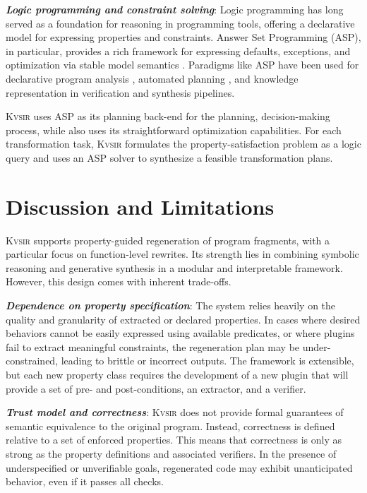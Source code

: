 \documentclass[sigplan,review,anonymous,10pt]{acmart}
\newcommand{\sys}{{\scshape Kv{\textalpha}sir}\xspace}
\newcommand{\heading}[1]{\vspace{2pt}\noindent\textbf{\emph{#1}}:\enspace}
\begin{document}
\heading{Logic programming and constraint solving}
Logic programming has long served as a foundation for reasoning in programming
tools, offering a declarative model for expressing properties and constraints.
Answer Set Programming (ASP), in particular, provides a rich framework for
expressing defaults, exceptions, and optimization via stable model semantics
\cite{Gelfond_2000, Gelfond_2002, Eiter_2009}. 
Paradigms like ASP have been used for
declarative program analysis \cite{benton2007interactive}, automated planning
\cite{nguyen2020explainable, son2022answersetplanningsurvey}, and knowledge
representation in verification and synthesis pipelines.

\sys uses ASP as its planning back-end for the planning, decision-making
process, while also uses its straightforward optimization capabilities.
For each transformation task, \sys formulates the property-satisfaction problem as a logic query and uses an ASP solver to
synthesize a feasible transformation plans.

\section{Discussion and Limitations}
\label{sec:discussion}

\sys supports property-guided regeneration of program fragments, with a
particular focus on function-level rewrites. Its strength lies in combining
symbolic reasoning and generative synthesis in a modular and interpretable
framework. However, this design comes with inherent trade-offs.

\heading{Dependence on property specification}
The system relies heavily on the quality and granularity of extracted or declared properties.
In cases where desired behaviors cannot be easily expressed using available
predicates, or where plugins fail to extract meaningful constraints, the
regeneration plan may be under-constrained, leading to brittle or incorrect
outputs. The framework is extensible, but each new property class requires the
development of a new plugin that will provide a set of pre- and
post-conditions, an extractor, and a verifier.

\heading{Trust model and correctness}
\sys
does not provide formal guarantees
of semantic equivalence
to the original program.
Instead,
correctness is defined relative to a set of enforced properties.
This means that correctness is only as strong as the property definitions and associated verifiers.
In the presence of underspecified or unverifiable goals,
regenerated code
may exhibit unanticipated behavior,
even if it passes all checks. 
\end{document}
